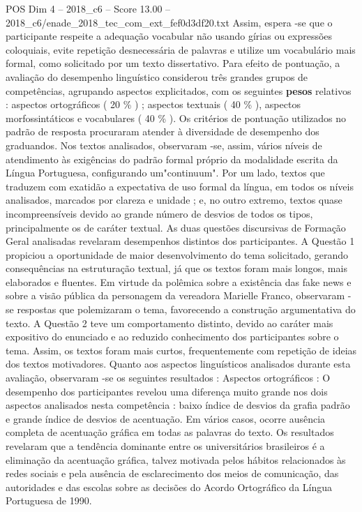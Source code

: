 \begin{textsample}{POS Dim 4 – 2018\_c6 – Score 13.00 – 2018\_c6/enade\_2018\_tec\_com\_ext\_fef0d3df20.txt}
Assim, espera -se que o participante respeite a adequação vocabular não usando gírias ou expressões coloquiais, evite repetição desnecessária de palavras e utilize um vocabulário mais formal, como solicitado por um texto dissertativo.
Para efeito de pontuação, a avaliação do desempenho linguístico considerou três grandes grupos de competências, agrupando aspectos explicitados, com os seguintes \textbf{pesos} relativos : aspectos ortográficos ( 20 \% ) ; aspectos textuais ( 40 \% ), aspectos morfossintáticos e vocabulares ( 40 \% ).
Os critérios de pontuação utilizados no padrão de resposta procuraram atender à diversidade de desempenho dos graduandos.
Nos textos analisados, observaram -se, assim, vários níveis de atendimento às exigências do padrão formal próprio da modalidade escrita da Língua Portuguesa, configurando um"continuum".
Por um lado, textos que traduzem com exatidão a expectativa de uso formal da língua, em todos os níveis analisados, marcados por clareza e unidade ; e, no outro extremo, textos quase incompreensíveis devido ao grande número de desvios de todos os tipos, principalmente os de caráter textual.
As duas questões discursivas de Formação Geral analisadas revelaram desempenhos distintos dos participantes.
A Questão 1 propiciou a oportunidade de maior desenvolvimento do tema solicitado, gerando consequências na estruturação textual, já que os textos foram mais longos, mais elaborados e fluentes.
Em virtude da polêmica sobre a existência das fake news e sobre a visão pública da personagem da vereadora Marielle Franco, observaram -se respostas que polemizaram o tema, favorecendo a construção argumentativa do texto.
A Questão 2 teve um comportamento distinto, devido ao caráter mais expositivo do enunciado e ao reduzido conhecimento dos participantes sobre o tema.
Assim, os textos foram mais curtos, frequentemente com repetição de ideias dos textos motivadores.
Quanto aos aspectos linguísticos analisados durante esta avaliação, observaram -se os seguintes resultados : Aspectos ortográficos : O desempenho dos participantes revelou uma diferença muito grande nos dois aspectos analisados nesta competência : baixo índice de desvios da grafia padrão e grande índice de desvios de acentuação.
Em vários casos, ocorre ausência completa de acentuação gráfica em todas as palavras do texto.
Os resultados revelaram que a tendência dominante entre os universitários brasileiros é a eliminação da acentuação gráfica, talvez motivada pelos hábitos relacionados às redes sociais e pela ausência de esclarecimento dos meios de comunicação, das autoridades e das escolas sobre as decisões do Acordo Ortográfico da Língua Portuguesa de 1990.

\end{textsample}
